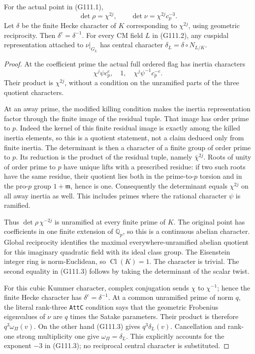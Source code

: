 \begin{lemma}
\label{AC-G111-det}
For the actual point in (G111.1),
\[
                    \det\rho=\chi^{2j},
             \qquad \det\nu=\chi^{2j}c_p^{-3}.
 \tag{G111.3}
\]
Let \(\delta\) be the finite Hecke character of \(K\)
corresponding to \(\chi^{2j}\), using geometric reciprocity.
Then \(\delta^c=\delta^{-1}\). For every CM field
\(L\) in (G111.2), any cuspidal representation attached to
\(\nu|_{G_L}\) has central character
\(\delta_L=\delta\circ N_{L/K}\).
\end{lemma}
\begin{proof}
At the coefficient prime the actual full ordered flag has
inertia characters
\[
             \chi^j\psi c_p^e,\quad 1,\quad
                         \chi^j\psi^{-1}c_p^{-e}.
 \tag{G111.4}
\]
Their product is \(\chi^{2j}\), without a condition on the
unramified parts of the three quotient characters.

At an away prime, the modified killing condition makes the
inertia representation factor through the finite image of
the residual tuple. That image has order prime to \(p\).
Indeed the kernel of this finite residual image is exactly
among the killed inertia elements, so this is a quotient
statement, not a claim deduced only from finite inertia.
The determinant is then a character of a finite group of
order prime to \(p\). Its reduction is the product of the
residual tuple, namely \(\bar\chi^{2j}\). Roots of unity
of order prime to \(p\) have unique lifts with a prescribed
residue: if two such roots have the same residue, their
quotient lies both in the prime-to-\(p\) torsion and in
the pro-\(p\) group \(1+\mathfrak m\), hence is one.
Consequently the determinant equals \(\chi^{2j}\) on
all away inertia as well. This includes primes where the
rational character \(\psi\) is ramified.

Thus \(\det\rho\,\chi^{-2j}\) is unramified at every
finite prime of \(K\). The original point has coefficients
in one finite extension of \(\mathbb Q_p\), so this is a
continuous abelian character. Global reciprocity identifies
the maximal everywhere-unramified abelian quotient for this
imaginary quadratic field with its ideal class group.
The Eisenstein integer ring is norm-Euclidean, so
\(\operatorname{Cl}(K)=1\). The character is trivial.
The second equality in (G111.3) follows by taking the
determinant of the scalar twist.

For this cubic Kummer character, complex conjugation sends
\(\chi\) to \(\chi^{-1}\); hence the finite Hecke
character has \(\delta^c=\delta^{-1}\).
At a common unramified prime of norm \(q\), the literal
rank-three \texttt{AttC} condition says that the geometric
Frobenius eigenvalues of \(\nu\) are \(q\) times the
Satake parameters. Their product is therefore
\(q^3\omega_\Pi(v)\). On the other hand (G111.3) gives
\(q^3\delta_L(v)\). Cancellation and rank-one strong
multiplicity one give \(\omega_\Pi=\delta_L\).
This explicitly accounts for the exponent \(-3\) in
(G111.3); no reciprocal central character is substituted.
\end{proof}

